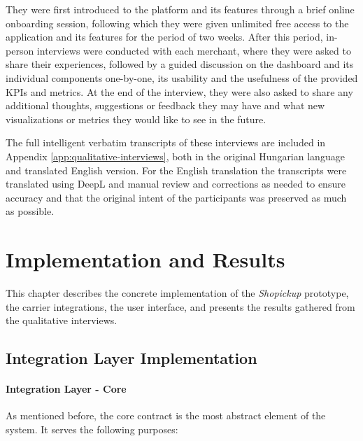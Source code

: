 \documentclass{imc-inf}
\begin{document}
They were first introduced to the platform and its features through a brief online onboarding session, following which they were given unlimited free access to the application and its features for the period of two weeks.
After this period, in-person interviews were conducted with each merchant, where they were asked to share their experiences, followed by a guided discussion on the dashboard and its individual components one-by-one, its usability and the usefulness of the provided KPIs and metrics.
At the end of the interview, they were also asked to share any additional thoughts, suggestions or feedback they may have and what new visualizations or metrics they would like to see in the future.

The full intelligent verbatim transcripts of these interviews are included in Appendix \ref{app:qualitative-interviews}, both in the original Hungarian language and translated English version.
For the English translation the transcripts were translated using DeepL and manual review and corrections as needed to ensure accuracy and that the original intent of the participants was preserved as much as possible.

\chapter{Implementation and Results}
\label{ch:implementation_and_results}

This chapter describes the concrete implementation of the \textit{Shopickup} prototype, the carrier integrations, the user interface, and presents the results gathered from the qualitative interviews.

\section{Integration Layer Implementation}
\subsubsection{Integration Layer - Core}
As mentioned before, the core contract is the most abstract element of the system. It serves the following purposes:
\end{document}
